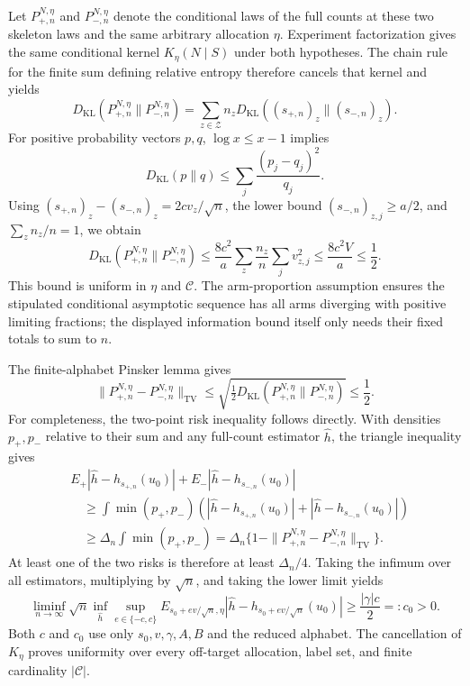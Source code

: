 Let \(P_{+,n}^{N,\eta}\) and \(P_{-,n}^{N,\eta}\) denote the conditional laws of the full counts at these two skeleton laws and the same arbitrary allocation \(\eta\).  Experiment factorization gives the same conditional kernel \(K_\eta(N\mid S)\) under both hypotheses.  The chain rule for the finite sum defining relative entropy therefore cancels that kernel and yields
\[
D_{\mathrm{KL}}(P_{+,n}^{N,\eta}\|P_{-,n}^{N,\eta})
=\sum_{z\in\mathcal Z}n_zD_{\mathrm{KL}}((s_{+,n})_z\|(s_{-,n})_z).
\]
For positive probability vectors \(p,q\), \(\log x\le x-1\) implies
\[
D_{\mathrm{KL}}(p\|q)
\le\sum_j\frac{(p_j-q_j)^2}{q_j}.
\]
Using \((s_{+,n})_z-(s_{-,n})_z=2cv_z/\sqrt n\), the lower bound \((s_{-,n})_{z,j}\ge a/2\), and \(\sum_zn_z/n=1\), we obtain
\[
D_{\mathrm{KL}}(P_{+,n}^{N,\eta}\|P_{-,n}^{N,\eta})
\le\frac{8c^2}{a}\sum_z\frac{n_z}{n}\sum_jv_{z,j}^2
\le\frac{8c^2V}{a}\le\frac12.
\]
This bound is uniform in \(\eta\) and \(\mathcal C\).  The arm-proportion assumption ensures the stipulated conditional asymptotic sequence has all arms diverging with positive limiting fractions; the displayed information bound itself only needs their fixed totals to sum to \(n\).

The finite-alphabet Pinsker lemma gives
\[
\|P_{+,n}^{N,\eta}-P_{-,n}^{N,\eta}\|_{\mathrm{TV}}
\le\sqrt{\tfrac12D_{\mathrm{KL}}(P_{+,n}^{N,\eta}\|P_{-,n}^{N,\eta})}
\le\frac12.
\]
For completeness, the two-point risk inequality follows directly.  With densities \(p_+,p_-\) relative to their sum and any full-count estimator \(\widehat h\), the triangle inequality gives
\[
\begin{aligned}
&E_+|\widehat h-h_{s_{+,n}}(u_0)|+E_-|\widehat h-h_{s_{-,n}}(u_0)|\\
&\quad\ge
\int\min(p_+,p_-)
\left(|\widehat h-h_{s_{+,n}}(u_0)|+|\widehat h-h_{s_{-,n}}(u_0)|\right)\\
&\quad\ge \Delta_n\int\min(p_+,p_-)
=\Delta_n\{1-\|P_{+,n}^{N,\eta}-P_{-,n}^{N,\eta}\|_{\mathrm{TV}}\}.
\end{aligned}
\]
At least one of the two risks is therefore at least \(\Delta_n/4\).  Taking the infimum over all estimators, multiplying by \(\sqrt n\), and taking the lower limit yields
\[
\liminf_{n\to\infty}\sqrt n\inf_{\widehat h}
\sup_{e\in\{-c,c\}}E_{s_0+ev/\sqrt n,\eta}
|\widehat h-h_{s_0+ev/\sqrt n}(u_0)|
\ge\frac{|\gamma|c}{2}=:c_0>0.
\]
Both \(c\) and \(c_0\) use only \(s_0,v,\gamma,A,B\) and the reduced alphabet.  The cancellation of \(K_\eta\) proves uniformity over every off-target allocation, label set, and finite cardinality \(|\mathcal C|\).

